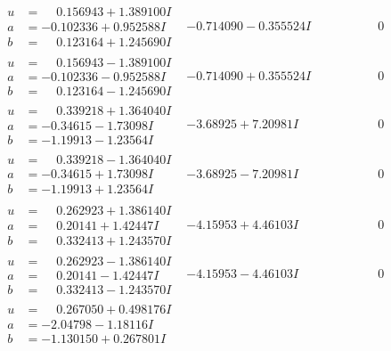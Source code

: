 \documentclass[1p]{elsarticle_modified}
\theoremstyle{definition}
\begin{document}
$$\begin{array}{c|c|c}
\begin{aligned}
u &= \phantom{-}0.156943 + 1.389100 I \\
a &= -0.102336 + 0.952588 I \\
b &= \phantom{-}0.123164 + 1.245690 I\end{aligned}
 & -0.714090 - 0.355524 I & \phantom{-0.000000 } 0 \\ \hline\begin{aligned}
u &= \phantom{-}0.156943 - 1.389100 I \\
a &= -0.102336 - 0.952588 I \\
b &= \phantom{-}0.123164 - 1.245690 I\end{aligned}
 & -0.714090 + 0.355524 I & \phantom{-0.000000 } 0 \\ \hline\begin{aligned}
u &= \phantom{-}0.339218 + 1.364040 I \\
a &= -0.34615 - 1.73098 I \\
b &= -1.19913 - 1.23564 I\end{aligned}
 & -3.68925 + 7.20981 I & \phantom{-0.000000 } 0 \\ \hline\begin{aligned}
u &= \phantom{-}0.339218 - 1.364040 I \\
a &= -0.34615 + 1.73098 I \\
b &= -1.19913 + 1.23564 I\end{aligned}
 & -3.68925 - 7.20981 I & \phantom{-0.000000 } 0 \\ \hline\begin{aligned}
u &= \phantom{-}0.262923 + 1.386140 I \\
a &= \phantom{-}0.20141 + 1.42447 I \\
b &= \phantom{-}0.332413 + 1.243570 I\end{aligned}
 & -4.15953 + 4.46103 I & \phantom{-0.000000 } 0 \\ \hline\begin{aligned}
u &= \phantom{-}0.262923 - 1.386140 I \\
a &= \phantom{-}0.20141 - 1.42447 I \\
b &= \phantom{-}0.332413 - 1.243570 I\end{aligned}
 & -4.15953 - 4.46103 I & \phantom{-0.000000 } 0 \\ \hline\begin{aligned}
u &= \phantom{-}0.267050 + 0.498176 I \\
a &= -2.04798 - 1.18116 I \\
b &= -1.130150 + 0.267801 I\end{aligned}

\end{array}$$
\end{document}
